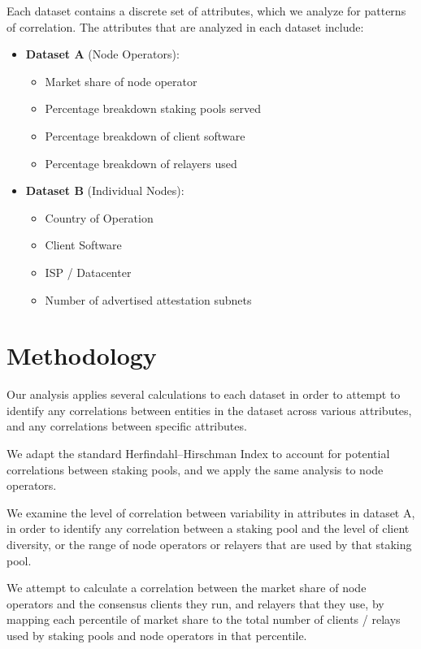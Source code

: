 \documentclass[conference]{IEEEtran}
\begin{document}
Each dataset contains a discrete set of attributes, which we analyze for patterns of correlation.  The attributes that are analyzed in each dataset include:

\begin{itemize}
    \item \textbf{Dataset A} (Node Operators):
    \begin{itemize}
        \item Market share of node operator
        \item Percentage breakdown staking pools served
        \item Percentage breakdown of client software
        \item Percentage breakdown of relayers used
    \end{itemize}
    \item \textbf{Dataset B} (Individual Nodes):
            \begin{itemize}
                \item Country of Operation
                \item Client Software
                \item ISP / Datacenter
                \item Number of advertised attestation subnets
            \end{itemize}
\end{itemize}

\section{Methodology}

Our analysis applies several calculations to each dataset in order to attempt to identify any correlations between entities in the dataset across various attributes, and any correlations between specific attributes.

We adapt the standard Herfindahl–Hirschman Index to account for potential correlations between staking pools, and we apply the same analysis to node operators.

We examine the level of correlation between variability in attributes in dataset A, in order to identify any correlation between a staking pool and the level of client diversity, or the range of node operators or relayers that are used by that staking pool.

We attempt to calculate a correlation between the market share of node operators and the consensus clients they run, and relayers that they use, by mapping each percentile of market share to the total number of clients / relays used by staking pools and node operators in that percentile.
\end{document}
